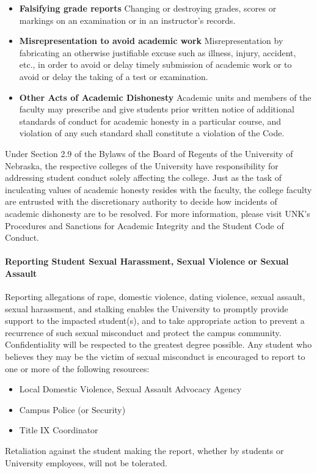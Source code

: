 \documentclass[12pt]{article}
\newcounter{ex}\setcounter{ex}{0}
\begin{document}
\begin{itemize}
    \item \textbf{Falsifying grade reports} Changing or destroying 
    grades, scores or markings on an examination or in an 
    instructor's records.

    \item \textbf{Misrepresentation to avoid academic work} 
    Misrepresentation by fabricating an otherwise justifiable 
    excuse such as illness, injury, accident, etc., in order 
    to avoid or delay timely submission of academic work or to 
    avoid or delay the taking of a test or examination.
    
    \item \textbf{Other Acts of Academic Dishonesty} Academic units 
    and members of the faculty may prescribe and give students prior 
    written notice of additional standards of conduct for academic 
    honesty in a particular course, and violation of any such 
    standard shall constitute a violation of the Code.

\end{itemize}
Under Section 2.9 of the Bylaws of the Board of Regents of the 
University of Nebraska, the respective colleges of the University 
have responsibility for addressing student conduct solely affecting 
the college. Just as the task of inculcating values of academic 
honesty resides with the faculty, the college faculty 
are entrusted with the discretionary authority to decide 
how incidents of academic dishonesty are to be resolved. 
For more information, please visit UNK's Procedures and 
Sanctions for Academic Integrity and the Student Code of Conduct.


\paragraph{Reporting Student Sexual Harassment, Sexual Violence or Sexual Assault}

Reporting allegations of rape, domestic violence, dating violence, sexual assault, 
sexual harassment, and stalking enables the University to promptly provide support 
to the impacted student(s), and to take appropriate action to prevent a recurrence 
of such sexual misconduct and protect the campus community. Confidentiality will 
be respected to the greatest degree possible. Any student who believes they may 
be the victim of sexual misconduct is encouraged to report to one or more of 
the following resources:

\begin{itemize}
\setlength\itemsep{-0.25em}
  \item Local Domestic Violence, Sexual Assault Advocacy Agency 

  \item Campus Police (or Security) 

  \item Title IX Coordinator 
\end{itemize}
Retaliation against the student making the report, whether by students or 
University employees, will not be tolerated.
\end{document}
